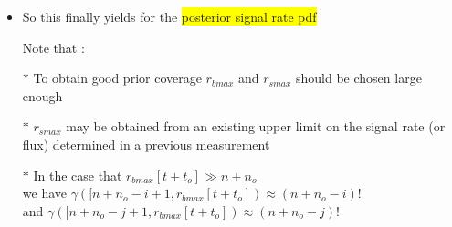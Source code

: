 \Tr
\begin{itemize}
\item So this finally yields for the \colorbox{yellow}{posterior signal rate pdf}
\item[] \begin{center}
      {\blue {}}
        \end{center}
\item[] Note that :
\item[$\ast$] To obtain good prior coverage $r_{bmax}$ and $r_{smax}$ should be chosen large enough
\item[$\ast$] $r_{smax}$ may be obtained from an existing upper limit on the signal rate (or flux)
              determined in a previous measurement
\item[$\ast$] In the case that $r_{bmax}[t+t_{o}] \gg n+n_{o}$\\
      we have $\gamma([n+n_{o}-i+1,r_{bmax}[t+t_{o}]) \approx (n+n_{o}-i)!$\\
      and $\gamma([n+n_{o}-j+1,r_{bmax}[t+t_{o}]) \approx (n+n_{o}-j)!$
\end{itemize}